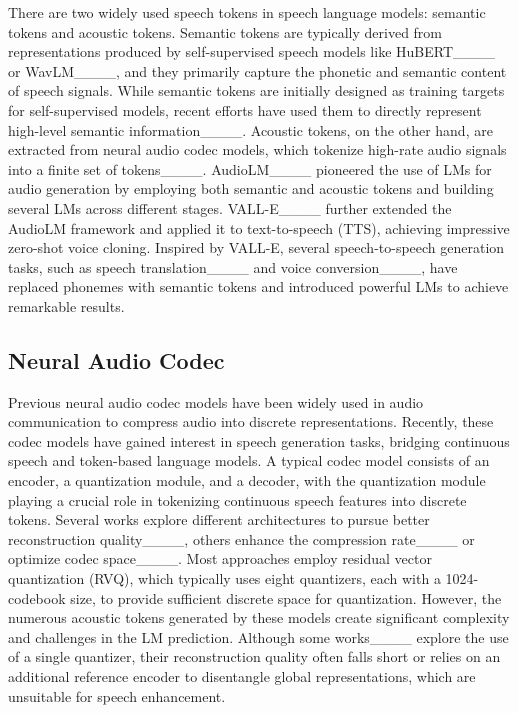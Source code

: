 There are two widely used speech tokens in speech language models: semantic tokens and acoustic tokens. Semantic tokens are typically derived from representations produced by self-supervised speech models like HuBERT____ or WavLM____, and they primarily capture the phonetic and semantic content of speech signals. While semantic tokens are initially designed as training targets for self-supervised models, recent efforts have used them to directly represent high-level semantic information____. Acoustic tokens, on the other hand, are extracted from neural audio codec models, which tokenize high-rate audio signals into a finite set of tokens____. AudioLM____ pioneered the use of LMs for audio generation by employing both semantic and acoustic tokens and building several LMs across different stages. VALL-E____ further extended the AudioLM framework and applied it to text-to-speech (TTS), achieving impressive zero-shot voice cloning. Inspired by VALL-E, several speech-to-speech generation tasks, such as speech translation____ and voice conversion____, have replaced phonemes with semantic tokens and introduced powerful LMs to achieve remarkable results.

\subsection{Neural Audio Codec}
Previous neural audio codec models have been widely used in audio communication to compress audio into discrete representations. Recently, these codec models have gained interest in speech generation tasks, bridging continuous speech and token-based language models. A typical codec model consists of an encoder, a quantization module, and a decoder, with the quantization module playing a crucial role in tokenizing continuous speech features into discrete tokens.
Several works explore different architectures to pursue better reconstruction quality____, others enhance the compression rate____ or optimize codec space____. 
Most approaches employ residual vector quantization (RVQ), which typically uses eight quantizers, each with a 1024-codebook size, to provide sufficient discrete space for quantization. However, the numerous acoustic tokens generated by these models create significant complexity and challenges in the LM prediction.
Although some works____ explore the use of a single quantizer, their reconstruction quality often falls short or relies on an additional reference encoder to disentangle global representations, which are unsuitable for speech enhancement.